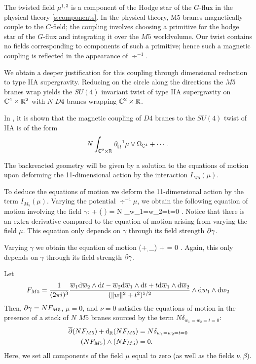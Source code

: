 The twisted field $\mu^{1,3}$ is a component of the Hodge star of the $G$-flux in the physical theory \ref{s:components}. 
In the physical theory, M5 branes magnetically couple to the $C$-field; the coupling involves choosing a primitive for the hodge star of the $G$-flux and integrating it over the $M5$ worldvolume. Our twist contains no fields corresponding to components of such a primitive; hence such a magnetic coupling is reflected in the appearance of $\div^{-1}$. 

\parsec[]

We obtain a deeper justification for this coupling through dimensional reduction to type IIA supergravity. 
Reducing on the circle along the directions the $M5$ branes wrap yields the $SU(4)$ invariant twist of type IIA supergravity on $\mathbb C^4 \times \mathbb R^2$ with $N$ $D4$ branes wrapping $\mathbb C^2 \times \mathbb R$. 

In \cite{CLSugra}, it is shown that the magnetic coupling of $D4$ branes to the $SU(4)$ twist of IIA is of the form
\[
N \int _{\mathbb{C}^2 \times \mathbb R} \partial_{\Omega}^{-1} \mu \vee \Omega_{\mathbb{C}^4} + \cdots .
\]

\parsec[s:m5backreact]

The backreacted geometry will be given by a solution to the equations of motion upon deforming the 11-dimensional action by the interaction $I_{M5}(\mu)$. 

To deduce the equations of motion we deform the 11-dimensional action by the term $I_{M_5}(\mu)$.
Varying the potential $\div^{-1} \mu$, we obtain the following equation of motion involving the field $\gamma$:
\beqn\label{eqn:m5eom1}
\dbar \del \gamma + \div \left( \mu\right) \wedge \del \gamma = N \delta_{w_1=w_2=t=0} .
\eeqn
Notice that there is an extra derivative compared to the equation of motion arising from varying the field $\mu$. 
This equation only depends on $\gamma$ through its field strength $\partial \gamma$. 

Varying $\gamma$ we obtain the equation of motion 
\beqn\label{eqn:m5eom2}
(\dbar + \d_\RR) \mu + \del \gamma \del \gamma = 0 .
\eeqn 
Again, this only depends on $\gamma$ through its field strength $\partial \gamma$.


\begin{lem}
\label{lem:ads7flux}
Let
\[
F_{M5} = \frac{1}{(2\pi i)^3} \frac{\overline{w}_1 {\rm d} \overline{w}_2 \wedge {\rm d} t - \overline{w}_2 {\rm d} \overline{w}_1 \wedge {\rm d} t + t {\rm d} \overline{w}_1 \wedge {\rm d} \overline{w}_2}{(\|w\|^2 + t^2)^{5/2}} \wedge {\rm d} w_1 \wedge {\rm d} w_2
\]
Then, $\partial\gamma = N F_{M5}$, $\mu = 0$, and $\nu = 0$ satisfies the equations of motion in the presence of a stack of $N$ $M5$ branes sourced by the term $N \delta_{w_1=w_2=t=0}$:
\begin{align*}
\overline{\partial} (NF_{M5}) + {\rm d}_{\mathbb R} (NF_{M5}) & = N \delta_{w_1=w_2=t=0}  \\ 
(NF_{M5}) \wedge (NF_{M5}) & = 0 .
\end{align*}
Here, we set all components of the field $\mu$ equal to zero (as well as the fields $\nu,\beta$). 
\end{lem}

